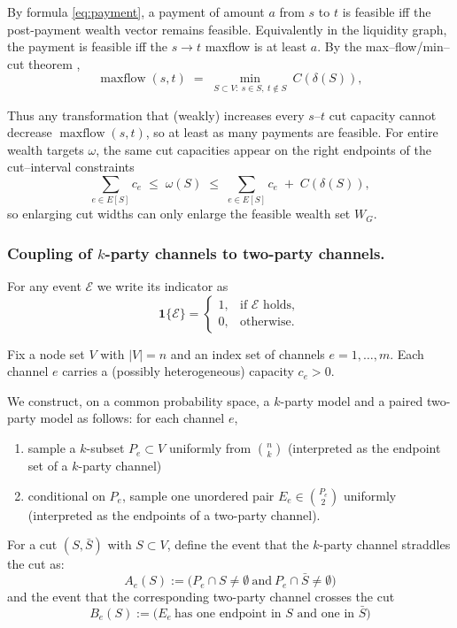 \documentclass[10pt,twocolumn]{article}
\begin{document}
By formula \eqref{eq:payment}, a payment of amount $a$ from $s$ to $t$ is feasible iff the post-payment
wealth vector remains feasible. Equivalently in the liquidity graph, the payment is feasible iff the $s\!\to t$ maxflow is at least $a$.
By the max–flow/min–cut theorem \cite{elias1956note,FordFulkerson1956},
\[
\operatorname{maxflow}(s,t)\;=\;\min_{S\subset V:\ s\in S,\ t\notin S}\ C(\delta(S)),
\]


Thus any transformation that (weakly) increases every $s$–$t$ cut capacity cannot decrease
$\operatorname{maxflow}(s,t)$, so at least as many payments are feasible.
For entire wealth targets $\omega$, the same cut capacities appear on the right endpoints of the
cut–interval constraints
\[
\sum_{e\in E[S]} c_e \;\le\; \omega(S) \;\le\; \sum_{e\in E[S]} c_e \;+\; C(\delta(S)),
\]
so enlarging cut widths can only enlarge the feasible wealth set $W_G$.

\subsubsection{Coupling of $k$-party channels to two-party channels.}
For any event $\mathcal{E}$ we write its indicator as
\[
\mathbf{1}\{\mathcal{E}\}
=\begin{cases}
1,&\text{if $\mathcal{E}$ holds},\\
0,&\text{otherwise}.
\end{cases}
\]

Fix a node set $V$ with $|V|=n$ and an index set of channels $e=1,\dots,m$.
Each channel $e$ carries a (possibly heterogeneous) capacity $c_e>0$.

We construct, on a common probability space, a $k$-party model and a paired two-party model as follows:
for each channel $e$,
\begin{enumerate}
\item sample a $k$-subset $P_e\subset V$ uniformly from $\binom{n}{k}$ (interpreted as the endpoint set of a $k$-party channel)
\item conditional on $P_e$, sample one unordered pair $E_e\in\binom{P_e}{2}$ uniformly (interpreted as the endpoints of a two-party channel).
\end{enumerate}
For a cut $(S,\bar S)$ with $S\subset V$, define the event that the $k$-party channel straddles the cut as:
\[
A_e(S):=\big(P_e\cap S\neq\emptyset\ \text{and}\ P_e\cap\bar S\neq\emptyset\big)
\]
and the event that the corresponding two-party channel crosses the cut
\[
B_e(S):=\big(E_e\ \text{has one endpoint in $S$ and one in $\bar S$}\big)
\]
\end{document}
